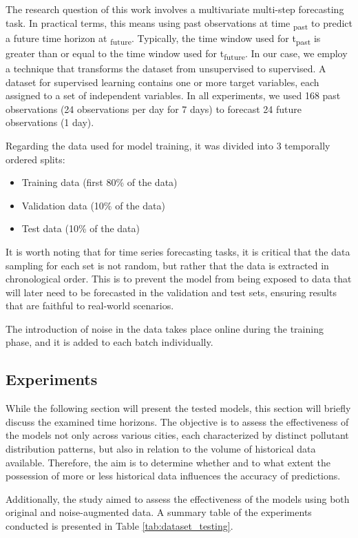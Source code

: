 The research question of this work involves a multivariate multi-step forecasting task. In practical terms, this means using past observations at time \textsubscript{past} to predict a future time horizon at \textsubscript{future}. Typically, the time window used for t\textsubscript{past} is greater than or equal to the time window used for t\textsubscript{future}.
In our case, we employ a technique that transforms the dataset from unsupervised to supervised. A dataset for supervised learning contains one or more target variables, each assigned to a set of independent variables.
In all experiments, we used 168 past observations (24 observations per day for 7 days) to forecast 24 future observations (1 day).

Regarding the data used for model training, it was divided into 3 temporally ordered splits:
\begin{itemize}
    \item Training data (first 80\% of the data)
    \item Validation data (10\% of the data)
    \item Test data (10\% of the data)
\end{itemize}

It is worth noting that for time series forecasting tasks, it is critical that the data sampling for each set is not random, but rather that the data is extracted in chronological order. This is to prevent the model from being exposed to data that will later need to be forecasted in the validation and test sets, ensuring results that are faithful to real-world scenarios.

The introduction of noise in the data takes place online during the training phase, and it is added to each batch individually.

\subsection{Experiments}
\label{subsec:experiments}
While the following section will present the tested models, this section will briefly discuss the examined time horizons. The objective is to assess the effectiveness of the models not only across various cities, each characterized by distinct pollutant distribution patterns, but also in relation to the volume of historical data available. Therefore, the aim is to determine whether and to what extent the possession of more or less historical data influences the accuracy of predictions.

Additionally, the study aimed to assess the effectiveness of the models using both original and noise-augmented data. A summary table of the experiments conducted is presented in Table \ref{tab:dataset_testing}.


